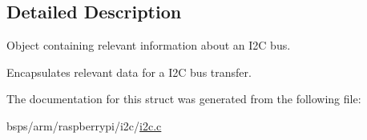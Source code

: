\subsection{Detailed Description}
Object containing relevant information about an I2C bus. 

Encapsulates relevant data for a I2C bus transfer. 

The documentation for this struct was generated from the following file\+:\begin{DoxyCompactItemize}
\item 
bsps/arm/raspberrypi/i2c/\mbox{\hyperlink{arm_2raspberrypi_2i2c_2i2c_8c}{i2c.\+c}}\end{DoxyCompactItemize}
